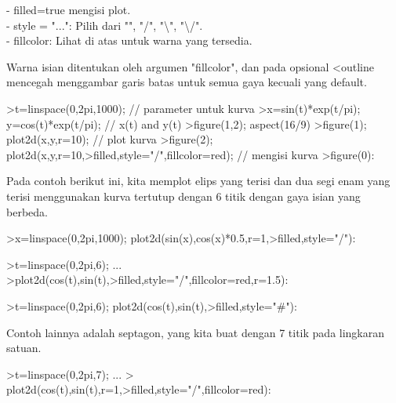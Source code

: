 \documentclass{article}
\begin{document}
\begin{eulernotebook}
\begin{eulercomment}
\begin{eulercomment}
\begin{eulercomment}
\begin{eulercomment}
\begin{eulercomment}
\begin{eulercomment}
\begin{eulercomment}
\begin{eulercomment}
\begin{eulercomment}
- filled=true mengisi plot.\\
- style = "...": Pilih dari "", "/", "\textbackslash{}", "\textbackslash{}/".\\
- fillcolor: Lihat di atas untuk warna yang tersedia.

Warna isian ditentukan oleh argumen "fillcolor", dan pada opsional
\textless{}outline mencegah menggambar garis batas untuk semua gaya kecuali yang
default.
\end{eulercomment}
\begin{eulerprompt}
>t=linspace(0,2pi,1000); // parameter untuk kurva
>x=sin(t)*exp(t/pi); y=cos(t)*exp(t/pi); // x(t) and y(t)
>figure(1,2); aspect(16/9)
>figure(1); plot2d(x,y,r=10); // plot kurva
>figure(2); plot2d(x,y,r=10,>filled,style="/",fillcolor=red); // mengisi kurva
>figure(0):
\end{eulerprompt}
\begin{eulercomment}
Pada contoh berikut ini, kita memplot elips yang terisi dan dua segi
enam yang terisi menggunakan kurva tertutup dengan 6 titik dengan gaya
isian yang berbeda.
\end{eulercomment}
\begin{eulerprompt}
>x=linspace(0,2pi,1000); plot2d(sin(x),cos(x)*0.5,r=1,>filled,style="/"):
\end{eulerprompt}
\begin{eulerprompt}
>t=linspace(0,2pi,6); ...
>plot2d(cos(t),sin(t),>filled,style="/",fillcolor=red,r=1.5):
\end{eulerprompt}
\begin{eulerprompt}
>t=linspace(0,2pi,6); plot2d(cos(t),sin(t),>filled,style="#"):
\end{eulerprompt}
\begin{eulercomment}
Contoh lainnya adalah septagon, yang kita buat dengan 7 titik pada
lingkaran satuan.
\end{eulercomment}
\begin{eulerprompt}
>t=linspace(0,2pi,7);  ...
> plot2d(cos(t),sin(t),r=1,>filled,style="/",fillcolor=red):
\end{eulerprompt}
\begin{eulercomment}

\end{eulercomment}
\end{eulercomment}
\end{eulercomment}
\end{eulercomment}
\end{eulercomment}
\end{eulercomment}
\end{eulercomment}
\end{eulercomment}
\end{eulercomment}
\end{eulernotebook}
\end{document}
